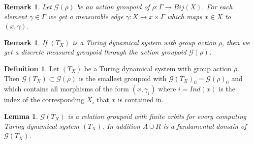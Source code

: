 \documentclass[12pt,a4paper]{scrartcl}
\theoremstyle{plain}
\newtheorem{Lemma}[Theorem]{Lemma}
\newtheorem{Remark}[Theorem]{Remark}
\theoremstyle{definition}
\newtheorem{Definition}[Theorem]{Definition}
\numberwithin{equation}{section}
\newcommand{\2}{\mathbb{Z} / 2 \mathbb{Z}}
\newcommand{\G}{\mathcal{G}}
\newcommand{\1}{\bar{1}}
\newcommand{\0}{\bar{0}}
\begin{document}
\begin{Remark} \label{mE_action_groupoid}
	Let $\G(\rho)$ be an action groupoid of $\rho: \Gamma \to Bij(X)$. For each element $\gamma \in \Gamma$ we get a measurable edge $\bar{\gamma}: X \to x \times \Gamma$ which maps $x \in X$ to $(x, \gamma)$.
\end{Remark}



\begin{Remark}
	If $(T_X)$ is a Turing dynamical system with group action $\rho$, then we get a discrete measured groupoid through the action groupoid $\G(\rho)$.
\end{Remark}
\begin{Definition}
	Let $(T_X)$ be a Turing dynamical system with group action $\rho$. Then $\G (T_X) \subset \G(\rho)$ is the smallest groupoid with $\G (T_X)_0 = \G(\rho)_0$ and which contains all morphisms of the form $(x, \gamma_i)$ where $i = Ind(x)$ is the index of the corresponding $X_i$ that $x$ is contained in.
\end{Definition}
\begin{Lemma} \label{TX_rel_groupoid}
	$\G (T_X)$ is a relation groupoid with finite orbits for every computing Turing dynamical system $(T_X)$. In addition $A \cup R$ is a fundamental domain of $\G (T_X)$.
\end{Lemma}
\end{document}
